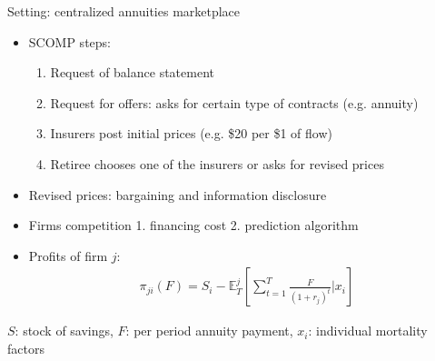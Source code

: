 \documentclass[10pt,aspectratio=169]{beamer}
\begin{document}
\begin{frame}{Setting: centralized annuities marketplace}\label{slide:setting}
       
    \begin{itemize}%
    \item SCOMP steps: 
    \begin{enumerate}
        \item Request of balance statement 
        \item Request for offers: asks for certain type of contracts (e.g. annuity)
        \item Insurers post initial prices (e.g. \$20 per \$1 of flow) \hyperlink{slide:fig5}{}
        \item Retiree chooses one of the insurers or asks for revised prices

    \end{enumerate}

        \item Revised prices: bargaining and information disclosure
        

    \item Firms competition 1. financing cost 2. prediction algorithm 

    \item Profits of firm $j$: 
    \begin{align*}
    \pi_{ji}(F) = S_i-  \mathbb{E}^j_{T} \left[\sum_{t=1}^T\frac{F}{(1+r_j)^t}|x_i \right]
    \end{align*}
    \end{itemize}

     $S$: stock of savings, $F$: per period annuity payment, $x_i$: individual mortality factors
    
\end{frame}
\end{document}
